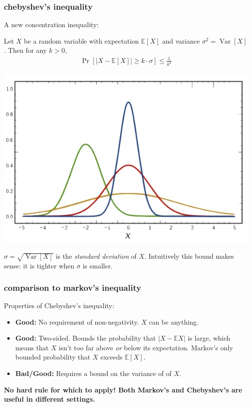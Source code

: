 \documentclass[handout,compress]{beamer}
\newcommand{\E}{\mathbb{E}}
\DeclareMathOperator{\Var}{Var}
\begin{document}
\begin{frame}
	\frametitle{chebyshev's inequality}
	\small
	A new concentration inequality:
	\begin{lemma}
		Let $X$ be a random variable with expectation $\E[X]$ and variance $\sigma^2 = \Var[X]$. Then for any $k > 0$,
		\begin{align*}
			\Pr[|X - \E[X]| \geq k\cdot\sigma] \leq \frac{1}{k^2}
		\end{align*}
	\end{lemma}
	\vspace{-.5em}
	\begin{center}
		\includegraphics[width=.4\textwidth]{rvs.png}
		
		$\sigma = \sqrt{\Var[X]}$ is the \emph{standard deviation} of $X$. Intuitively this bound makes sense: it is {tighter} when $\sigma$ is smaller.
	\end{center}
\end{frame}

\begin{frame}
	\frametitle{comparison to markov's inequality}
	\small
	Properties of Chebyshev's inequality:
	\begin{itemize}
		\item \textbf{Good:} No requirement of non-negativity. $X$ can be anything.
		\item \textbf{Good:} Two-sided. Bounds the probability that $|X - \E X|$ is large, which means that $X$ isn't too far above \emph{or} below its expectation. Markov's only bounded probability that $X$ exceeds $\E[X]$.
		\item \textbf{Bad/Good:} Requires a bound on the variance of of $X$.  
	\end{itemize}
	\alert{\textbf{No hard rule for which to apply! Both Markov's and Chebyshev's are useful in different settings.}}
\end{frame} 
\end{document}
